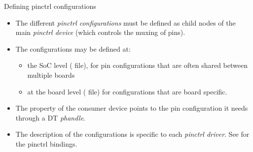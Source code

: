 \begin{frame}{Defining pinctrl configurations}
  \begin{itemize}
  \item The different {\em pinctrl configurations} must be defined as
    child nodes of the main {\em pinctrl device} (which controls the
    muxing of pins).
  \item The configurations may be defined at:
    \begin{itemize}
    \item the SoC level ( file), for pin configurations
      that are often shared between multiple boards
    \item at the board level ( file) for configurations
      that are board specific.
    \end{itemize}
  \item The  property of the consumer device points
    to the pin configuration it needs through a DT {\em phandle}.
  \item The description of the configurations is specific to each {\em
      pinctrl driver}. See
     for the pinctrl bindings.
  \end{itemize}
\end{frame}

